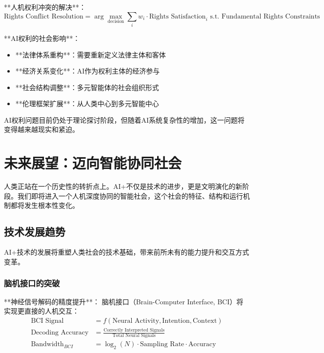 **人机权利冲突的解决**：
\begin{equation}
\text{Rights Conflict Resolution} = \arg\max_{\text{decision}} \sum_{i} w_i \cdot \text{Rights Satisfaction}_i \text{ s.t. } \text{Fundamental Rights Constraints}
\end{equation}

**AI权利的社会影响**：
\begin{itemize}
\item **法律体系重构**：需要重新定义法律主体和客体
\item **经济关系变化**：AI作为权利主体的经济参与
\item **社会结构调整**：多元智能体的社会组织形式
\item **伦理框架扩展**：从人类中心到多元智能中心
\end{itemize}

\begin{center}
AI权利问题目前仍处于理论探讨阶段，但随着AI系统复杂性的增加，这一问题将变得越来越现实和紧迫。
\end{center}

\section{未来展望：迈向智能协同社会}

人类正站在一个历史性的转折点上。AI+不仅是技术的进步，更是文明演化的新阶段。我们即将进入一个人机深度协同的智能社会，这个社会的特征、结构和运行机制都将发生根本性变化。

\subsection{技术发展趋势}

AI+技术的发展将重塑人类社会的技术基础，带来前所未有的能力提升和交互方式变革。

\subsubsection{脑机接口的突破} %

**神经信号解码的精度提升**：
脑机接口（Brain-Computer Interface, BCI）将实现更直接的人机交互：
\begin{align}
\text{BCI Signal} &= f(\text{Neural Activity}, \text{Intention}, \text{Context}) \\
\text{Decoding Accuracy} &= \frac{\text{Correctly Interpreted Signals}}{\text{Total Neural Signals}} \\
\text{Bandwidth}_{BCI} &= \log_2(N) \cdot \text{Sampling Rate} \cdot \text{Accuracy}
\end{align}

